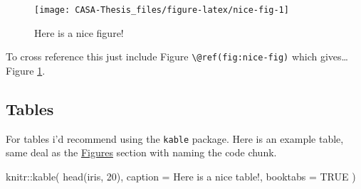 \documentclass[
  12pt,
  oneside]{book}
\newenvironment{Shaded}{\begin{snugshade}}{\end{snugshade}}
\newcommand{\AttributeTok}[1]{\textcolor[rgb]{0.77,0.63,0.00}{#1}}
\newcommand{\ConstantTok}[1]{\textcolor[rgb]{0.00,0.00,0.00}{#1}}
\newcommand{\DecValTok}[1]{\textcolor[rgb]{0.00,0.00,0.81}{#1}}
\newcommand{\FunctionTok}[1]{\textcolor[rgb]{0.00,0.00,0.00}{#1}}
\newcommand{\NormalTok}[1]{#1}
\newcommand{\SpecialCharTok}[1]{\textcolor[rgb]{0.00,0.00,0.00}{#1}}
\newcommand{\StringTok}[1]{\textcolor[rgb]{0.31,0.60,0.02}{#1}}
\begin{document}
\begin{figure}
\texttt{[image: CASA-Thesis\_files/figure-latex/nice-fig-1]} \caption{Here is a nice figure!}\label{fig:nice-fig}
\end{figure}

To cross reference this just include Figure \texttt{\textbackslash{}@ref(fig:nice-fig)} which gives\ldots Figure \ref{fig:nice-fig}.

\hypertarget{tables}{%
\subsection{Tables}\label{tables}}

For tables i'd recommend using the \texttt{kable} package. Here is an example table, same deal as the \protect\hyperlink{figures-1}{Figures} section with naming the code chunk.

\begin{Shaded}
\begin{Highlighting}[]
\NormalTok{knitr}\SpecialCharTok{::}\FunctionTok{kable}\NormalTok{(}
  \FunctionTok{head}\NormalTok{(iris, }\DecValTok{20}\NormalTok{), }\AttributeTok{caption =} \StringTok{\textquotesingle{}Here is a nice table!\textquotesingle{}}\NormalTok{,}
  \AttributeTok{booktabs =} \ConstantTok{TRUE}
\NormalTok{)}
\end{Highlighting}
\end{Shaded}
\end{document}
